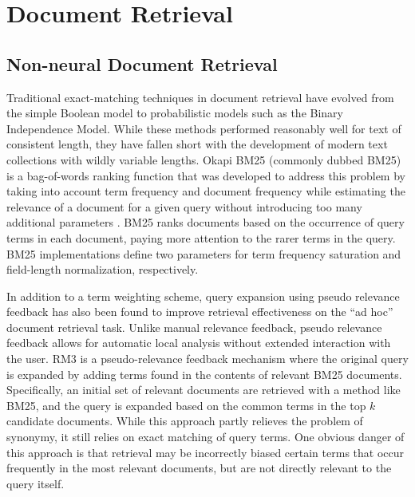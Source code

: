\section{Document Retrieval}

\subsection{Non-neural Document Retrieval}

Traditional exact-matching techniques in document retrieval have evolved from the simple Boolean model to probabilistic models such as the Binary Independence Model.
While these methods performed reasonably well for text of consistent length, they have fallen short with the development of modern text collections with wildly variable lengths.
Okapi BM25 (commonly dubbed BM25) is a bag-of-words ranking function that was developed to address this problem by taking into account term frequency and document frequency while estimating the relevance of a document for a given query without introducing too many additional parameters \cite{jones2000probabilistic}.
BM25 ranks documents based on the occurrence of query terms in each document, paying more attention to the rarer terms in the query.
BM25 implementations define two parameters for term frequency saturation and field-length normalization, respectively.

In addition to a term weighting scheme, query expansion using pseudo relevance feedback has also been found to improve retrieval effectiveness on the ``ad hoc'' document retrieval task.
Unlike manual relevance feedback, pseudo relevance feedback allows for automatic local analysis without extended interaction with the user.
RM3 is a pseudo-relevance feedback mechanism where the original query is expanded by adding terms found in the contents of relevant BM25 documents.
Specifically, an initial set of relevant documents are retrieved with a method like BM25, and the query is expanded based on the common terms in the top $ k $ candidate documents.
While this approach partly relieves the problem of synonymy, it still relies on exact matching of query terms.
One obvious danger of this approach is that retrieval may be incorrectly biased certain terms that occur frequently in the most relevant documents, but are not directly relevant to the query itself.


